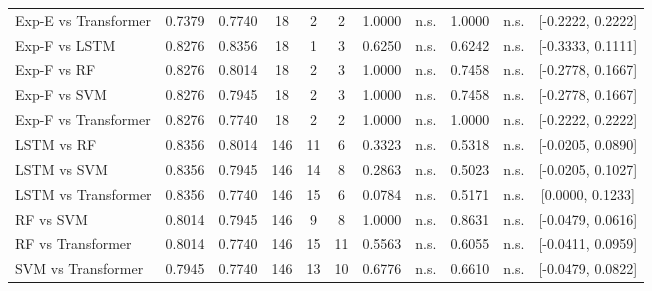 \begin{table}[htbp]
{\begin{tabular}{l cc c cc cc cc c}
  Exp-E vs Transformer & 0.7379 & 0.7740 & 18 & 2 & 2 & 1.0000 & n.s. & 1.0000 & n.s. & [-0.2222, 0.2222] \\
  Exp-F vs LSTM & 0.8276 & 0.8356 & 18 & 1 & 3 & 0.6250 & n.s. & 0.6242 & n.s. & [-0.3333, 0.1111] \\
  Exp-F vs RF & 0.8276 & 0.8014 & 18 & 2 & 3 & 1.0000 & n.s. & 0.7458 & n.s. & [-0.2778, 0.1667] \\
  Exp-F vs SVM & 0.8276 & 0.7945 & 18 & 2 & 3 & 1.0000 & n.s. & 0.7458 & n.s. & [-0.2778, 0.1667] \\
  Exp-F vs Transformer & 0.8276 & 0.7740 & 18 & 2 & 2 & 1.0000 & n.s. & 1.0000 & n.s. & [-0.2222, 0.2222] \\
  LSTM vs RF & 0.8356 & 0.8014 & 146 & 11 & 6 & 0.3323 & n.s. & 0.5318 & n.s. & [-0.0205, 0.0890] \\
  LSTM vs SVM & 0.8356 & 0.7945 & 146 & 14 & 8 & 0.2863 & n.s. & 0.5023 & n.s. & [-0.0205, 0.1027] \\
  LSTM vs Transformer & 0.8356 & 0.7740 & 146 & 15 & 6 & 0.0784 & n.s. & 0.5171 & n.s. & [0.0000, 0.1233] \\
  RF vs SVM & 0.8014 & 0.7945 & 146 & 9 & 8 & 1.0000 & n.s. & 0.8631 & n.s. & [-0.0479, 0.0616] \\
  RF vs Transformer & 0.8014 & 0.7740 & 146 & 15 & 11 & 0.5563 & n.s. & 0.6055 & n.s. & [-0.0411, 0.0959] \\
  SVM vs Transformer & 0.7945 & 0.7740 & 146 & 13 & 10 & 0.6776 & n.s. & 0.6610 & n.s. & [-0.0479, 0.0822] \\
\bottomrule
\end{tabular}%
}
\end{table}
